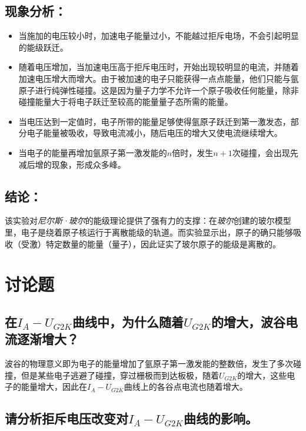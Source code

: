 \documentclass{ctexart}
\begin{document}
\subsection{现象分析：}
\begin{itemize}
    \item 当施加的电压较小时，加速电子能量过小，不能越过拒斥电场，不会引起明显的能级跃迁。
    \item 随着电压增加，当加速电压高于拒斥电压时，开始出现较明显的电流，并随着加速电压增大而增大。由于被加速的电子只能获得一点点能量，他们只能与氩原子进行纯弹性碰撞。这是因为量子力学不允许一个原子吸收任何能量，除非碰撞能量大于将电子跃迁至较高的能量量子态所需的能量。
    \item 当电压达到一定值时，电子所带的能量足够使得氩原子跃迁到第一激发态，部分电子能量被吸收，导致电流减小，随后电压的增大又使电流继续增大。
    \item 当电子的能量再增加氩原子第一激发能的$n$倍时，发生$n+1$次碰撞，会出现先减后增的现象，形成众多峰。
\end{itemize}

\subsection{结论：}

该实验对\textit{尼尔斯·玻尔}的能级理论提供了强有力的支撑：在\textit{玻尔}创建的玻尔模型里，电子是绕着原子核运行于离散能级的轨道。而实验显示出，原子的确只能够吸收（受激）特定数量的能量（量子），因此证实了玻尔原子的能级是离散的。

\section{讨论题}

\subsection{在$I_A{-}U_{G2K}$曲线中，为什么随着$U_{G2K}$的增大，波谷电流逐渐增大？}

波谷的物理意义即为电子的能量增加了氩原子第一激发能的整数倍，发生了多次碰撞，但是某些电子逃避了碰撞，穿过栅极而到达板极，随着$U_{G2K}$的增大，这些电子的能量增大，因此在$I_A{-}U_{G2K}$曲线上的各谷点电流也随着增大。

\subsection{请分析拒斥电压改变对$I_A-U_{G2K}$曲线的影响。}
\end{document}
